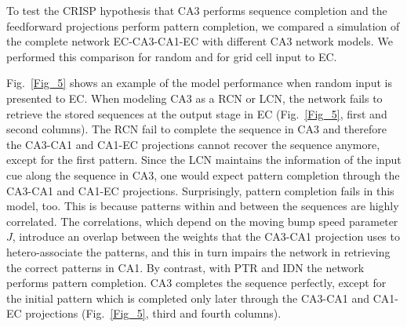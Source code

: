 \documentclass[utf8]{frontiersSCNS} %
\begin{document}
To test the CRISP hypothesis that CA3 performs sequence completion and the feedforward projections perform pattern completion, we compared a simulation of the complete network EC-CA3-CA1-EC with different CA3 network models. We performed this comparison for random and for grid cell input to EC. 

Fig.~\ref{Fig_5} shows an example of the model performance when random input is presented to EC. When modeling CA3 as a RCN or LCN, the network fails to retrieve the stored sequences at the output stage in EC (Fig.~\ref{Fig_5}, first and second columns). The RCN fail to complete the sequence in CA3 and therefore the CA3-CA1 and CA1-EC projections cannot recover the sequence anymore, except for the first pattern. Since the LCN maintains the information of the input cue along the sequence in CA3, one would expect pattern completion through the CA3-CA1 and CA1-EC projections. Surprisingly, pattern completion fails in this model, too. This is because patterns within and between the sequences are highly correlated. The correlations, which depend on the moving bump speed parameter $J$, introduce an overlap between the weights that the CA3-CA1 projection uses to hetero-associate the patterns, and this in turn impairs the network in retrieving the correct patterns in CA1. By contrast, with PTR and IDN the network performs pattern completion. CA3 completes the sequence perfectly, except for the initial pattern which is completed only later through the CA3-CA1 and CA1-EC projections (Fig.~\ref{Fig_5}, third and fourth columns).  
\end{document}
